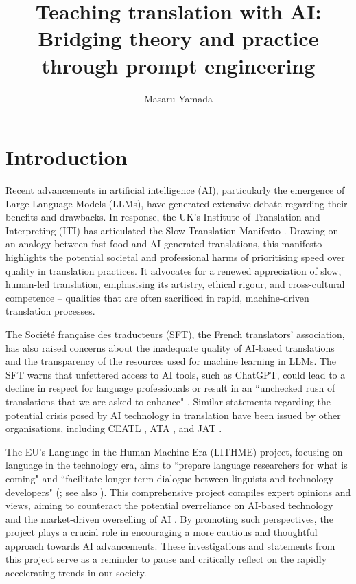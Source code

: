 \documentclass[output=paper,colorlinks,citecolor=brown, japanesefont]{langscibook}
\author{Masaru Yamada\orcid{0000-0002-7490-5414}\affiliation{Rikkyo University, Japan} }
\title[Teaching translation with AI]{Teaching translation with AI: Bridging theory and practice through prompt engineering}
\begin{document}
\maketitle

\section{Introduction}
Recent advancements in artificial intelligence (AI), particularly the emergence of Large Language Models (LLMs), have generated extensive debate regarding their benefits and drawbacks. In response, the UK’s Institute of Translation and Interpreting (ITI) has articulated the Slow Translation Manifesto \citep{ITI2024}. Drawing on an analogy between fast food and AI-generated translations, this manifesto highlights the potential societal and professional harms of prioritising speed over quality in translation practices. It advocates for a renewed appreciation of slow, human-led translation, emphasising its artistry, ethical rigour, and cross-cultural competence -- qualities that are often sacrificed in rapid, machine-driven translation processes.

The Société française des traducteurs (SFT), the French translators' association, has also raised concerns about the inadequate quality of AI-based translations and the transparency of the resources used for machine learning in LLMs. The SFT warns that unfettered access to AI tools, such as ChatGPT, could lead to a decline in respect for language professionals or result in an ``unchecked rush of translations that we are asked to enhance" \citep{Slator2024}. Similar statements regarding the potential crisis posed by AI technology in translation have been issued by other organisations, including CEATL \citep{CEATL2024}, ATA \citep{ATA2024}, and JAT \citep{JAT2024}.

The EU's Language in the Human-Machine Era (LITHME) project, focusing on language in the technology era, aims to ``prepare language researchers for what is coming" and ``facilitate longer-term dialogue between linguists and technology developers" (\citealt{LITHME2021}; see also \citealt{Sayers2021}). This comprehensive project compiles expert opinions and views, aiming to counteract the potential overreliance on AI-based technology and the market-driven overselling of AI \citep{Sayers2021,way2025}. By promoting such perspectives, the project plays a crucial role in encouraging a more cautious and thoughtful approach towards AI advancements. These investigations and statements from this project serve as a reminder to pause and critically reflect on the rapidly accelerating trends in our society.
\end{document}

